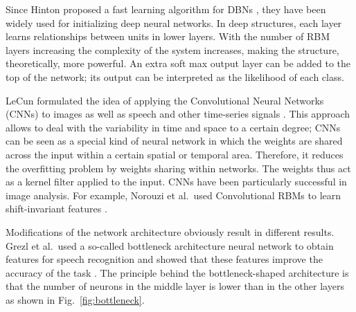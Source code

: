 \documentclass{article}
\begin{document}
Since Hinton proposed a fast learning algorithm for DBNs \cite{hinton2006fast}, they have been widely used for initializing deep neural networks. In deep structures, each layer learns relationships between units in lower layers. With the number of RBM layers increasing the complexity of the system increases, making the structure, theoretically, more powerful. An extra soft max output layer can be added to the top of the network; its output can be interpreted as the likelihood of each class.

LeCun formulated the idea of applying the Convolutional Neural Networks (CNNs) to images as well as speech and other time-series signals \cite{lecun1995convolutional}. This approach allows to deal with the variability in time and space to a certain degree; CNNs can be seen as a special kind of neural network in which the weights are shared across the input within a certain spatial or temporal area.
Therefore, it reduces the overfitting problem by weights sharing within networks. The weights thus act as a kernel filter applied to the input. CNNs have been particularly successful in image analysis. For example, Norouzi et al.\ used Convolutional RBMs to learn shift-invariant features \cite{norouzi2009stacks}. 


Modifications of the network architecture obviously result in different results. Grezl et al.\ used a so-called bottleneck architecture neural network to obtain features for speech recognition and showed that these features improve the accuracy of the task \cite{grezl2007probabilistic}. The principle behind the bottleneck-shaped architecture is that the number of neurons in the middle layer is lower than in the other layers as shown in Fig.~\ref{fig:bottleneck}.
\end{document}
